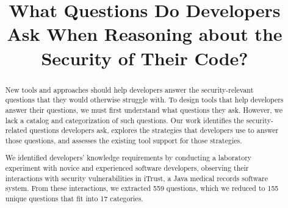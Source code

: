 \documentclass[conference]{IEEEtran}
\begin{document}
%

\title{What Questions Do Developers Ask When Reasoning about the Security of Their Code?}


\author{
}



\maketitle

\begin{abstract}

New tools and approaches should help developers answer the security-relevant questions that they would otherwise struggle with. 
To design tools that help developers answer their questions, we must first understand what questions they ask.
However, we lack a catalog and categorization of such questions. 
Our work identifies the security-related questions developers ask, explores the strategies that developers use to answer those questions, and assesses the existing tool support for those strategies.  

We identified developers' knowledge requirements by conducting a laboratory experiment with novice and experienced software developers, observing their interactions with security vulnerabilities in iTrust, a Java medical records software system.
From these interactions, we extracted 559 questions, which we reduced to 155 unique questions that fit into 17 categories.


\end{abstract}

%
\IEEEpeerreviewmaketitle
\end{document}
